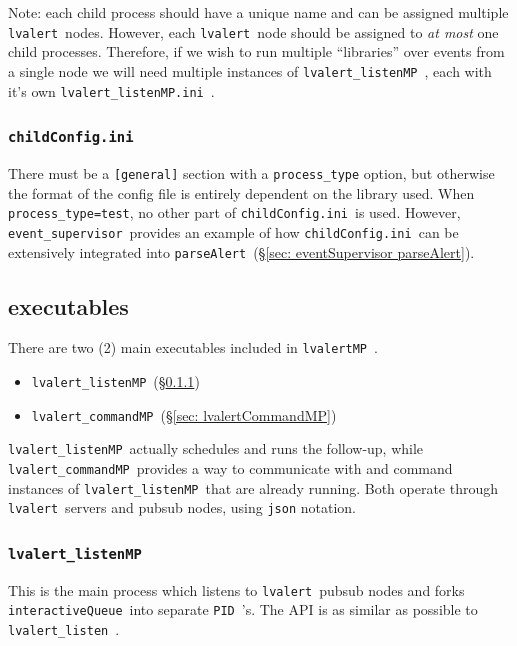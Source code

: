 \documentclass{article}
\newcommand{\PID}{\texttt{PID}~}
\newcommand{\alert}{\texttt{lvalert}~}
\newcommand{\lvalertListen}{\texttt{lvalert\_listen}~}
\newcommand{\lvalertMP}{\texttt{lvalertMP}~}
\newcommand{\lvalertListenMP}{\texttt{lvalert\_listenMP}~}
\newcommand{\lvalertCommandMP}{\texttt{lvalert\_commandMP}~}
\newcommand{\interactiveQueue}{\texttt{interactiveQueue}~}
\newcommand{\parseAlert}{\texttt{parseAlert}~}
\newcommand{\lvalertMPini}{\texttt{lvalert\_listenMP.ini}~}
\newcommand{\childConfigini}{\texttt{childConfig.ini}~}
\newcommand{\eventSupervisor}{\texttt{event\_supervisor}~}
\begin{document}
Note: each child process should have a unique name and can be assigned multiple \alert nodes. 
However, each \alert node should be assigned to \textit{at most} one child processes. 
Therefore, if we wish to run multiple ``libraries'' over events from a single node we will need multiple instances of \lvalertListenMP, each with it's own \lvalertMPini.


\subsubsection{\childConfigini}
\label{sec: childConfigini}

There must be a \texttt{[general]} section with a \texttt{process\_type} option, but otherwise the format of the config file is entirely dependent on the library used.
When \texttt{process\_type=test}, no other part of \childConfigini is used.
However, \eventSupervisor provides an example of how \childConfigini can be extensively integrated into \parseAlert (\S\ref{sec: eventSupervisor parseAlert}).


\subsection{executables}
\label{sec: executables}

There are two (2) main executables included in \lvalertMP.
\begin{itemize}
    \item{\lvalertListenMP (\S\ref{sec: lvalertListenMP})}
    \item{\lvalertCommandMP (\S\ref{sec: lvalertCommandMP})}
\end{itemize}
\lvalertListenMP actually schedules and runs the follow-up, while \lvalertCommandMP provides a way to communicate with and command instances of \lvalertListenMP that are already running.
Both operate through \alert servers and pubsub nodes, using \texttt{json} notation.


\subsubsection{\lvalertListenMP}
\label{sec: lvalertListenMP}

This is the main process which listens to \alert pubsub nodes and forks \interactiveQueue into separate \PID's. 
The API is as similar as possible to \lvalertListen.
\end{document}

